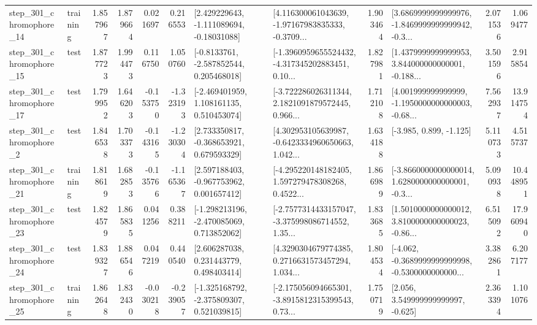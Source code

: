 \begin{tabular}{llrrrrllrlrr}
  step\_301\_chromophore\_14 &  training &      1.857967 &    1.879664 &      0.021697 &  0.216553 &    [2.429229643, -1.111089694, -0.18031088] &  [4.116300061043639, -1.97167983835333, -0.3709... &       1.903464 &  [3.6869999999999976, -1.8469999999999942, -0.3... &            2.071536 &          1.069477 \\
  step\_301\_chromophore\_15 &      test &      1.877723 &    1.994473 &      0.116750 &  1.050760 &     [-0.8133761, -2.587852544, 0.205468018] &  [-1.3960959655524432, -4.317345202883451, 0.10... &       1.827981 &  [1.4379999999999953, 3.844000000000001, -0.188... &            3.501596 &          2.915854 \\
  step\_301\_chromophore\_17 &      test &      1.799952 &    1.646203 &     -0.153750 & -1.323193 &    [-2.469401959, 1.108161135, 0.510453074] &  [-3.722286026311344, 2.1821091879572445, 0.966... &       1.712108 &  [4.001999999999999, -1.1950000000000003, -0.68... &            7.562937 &         13.914754 \\
   step\_301\_chromophore\_2 &      test &      1.846538 &    1.703373 &     -0.143165 & -1.230304 &    [2.733350817, -0.368653921, 0.679593329] &  [4.302953105639987, -0.6423334960650663, 1.042... &       1.634188 &                            [-3.985, 0.899, -1.125] &            5.110733 &          4.515737 \\
  step\_301\_chromophore\_21 &  training &      1.818619 &    1.682853 &     -0.135766 & -1.165367 &    [2.597188403, -0.967753962, 0.001657412] &  [-4.295220148182405, 1.597279478308268, 0.4522... &       1.866989 &  [-3.8660000000000014, 1.6280000000000001, -0.3... &            5.090938 &         10.448951 \\
  step\_301\_chromophore\_23 &      test &      1.824579 &    1.865835 &      0.041256 &  0.388211 &   [-1.298213196, -2.470085069, 0.713852062] &  [-2.7577314433157047, -3.375998086714552, 1.35... &       1.833685 &  [1.5010000000000012, 3.8100000000000023, -0.86... &            6.515092 &         17.960940 \\
  step\_301\_chromophore\_24 &      test &      1.839327 &    1.886546 &      0.047219 &  0.440540 &     [2.606287038, 0.231443779, 0.498403414] &  [4.3290304679774385, 0.2716631573457294, 1.034... &       1.804534 &  [-4.062, -0.3689999999999998, -0.5300000000000... &            3.382861 &          6.207177 \\
  step\_301\_chromophore\_25 &  training &      1.862648 &    1.832430 &     -0.030218 & -0.239057 &   [-1.325168792, -2.375809307, 0.521039815] &  [-2.175056094665301, -3.8915812315399543, 0.73... &       1.750719 &                 [2.056, 3.549999999999997, -0.625] &            2.363394 &          1.101076 \\

\end{tabular}
